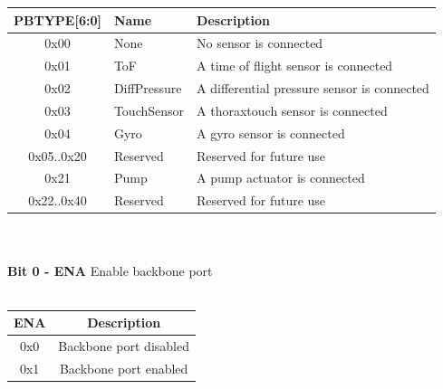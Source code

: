 \documentclass{article}
\begin{document}
\begin{tabular}{|c|l|l|}
    \hline
    PBTYPE[6:0] & Name & Description \\ \hline
    0x00 & None & No sensor is connected\\ \hline
    0x01 & ToF & A time of flight sensor is connected\\ \hline
    0x02 & DiffPressure & A differential pressure sensor is connected\\ \hline
    0x03 & TouchSensor & A thoraxtouch sensor is connected\\ \hline
    0x04 & Gyro & A gyro sensor is connected\\ \hline
    0x05..0x20 & Reserved & Reserved for future use\\ \hline
    0x21 & Pump & A pump actuator is connected\\ \hline
    0x22..0x40 & Reserved & Reserved for future use \\ \hline
\end{tabular}
\\\\
\textbf{Bit 0 - ENA} Enable backbone port\\\\
\begin{tabular}{|c|c|}
    \hline
   ENA & Description\\ \hline
   0x0 & Backbone port disabled\\ \hline
   0x1 & Backbone port enabled \\ \hline
\end{tabular}

\pagebreak
\end{document}
